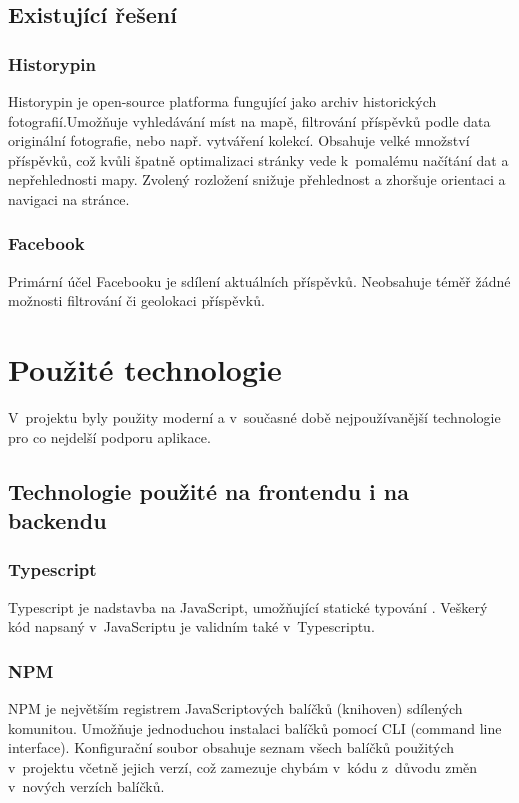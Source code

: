 \documentclass[12pt, a4paper,
  oneside,      %
]{report}
\begin{document}
\section{Existující řešení}
\subsection{Historypin}
Historypin je open-source platforma fungující jako archiv historických fotografií.Umožňuje vyhledávání míst na mapě, filtrování příspěvků podle data originální fotografie, nebo např. vytváření kolekcí. Obsahuje velké množství příspěvků, což kvůli špatně optimalizaci stránky vede k~pomalému načítání dat a nepřehlednosti mapy. Zvolený rozložení snižuje přehlednost a zhoršuje orientaci a navigaci na stránce.
\subsection{Facebook}
Primární účel Facebooku je sdílení aktuálních příspěvků. Neobsahuje téměř žádné možnosti filtrování či geolokaci příspěvků.

\chapter{Použité technologie}
V~projektu byly použity moderní a v~současné době nejpoužívanější technologie pro co nejdelší podporu aplikace.
\section{Technologie použité na frontendu i na backendu}
    \subsection{Typescript}
    Typescript je nadstavba na JavaScript, umožňující statické typování \cite{DynamicVsStaticTyping}. Veškerý kód napsaný v~JavaScriptu je validním také v~Typescriptu. \cite{whatIsTypescript}\cite{typescriptForTheNewProgrammer}

    \subsection{NPM}
    NPM je největším registrem JavaScriptových balíčků (knihoven) sdílených komunitou. Umožňuje jednoduchou instalaci balíčků pomocí CLI (command line interface). Konfigurační soubor obsahuje seznam všech balíčků použitých v~projektu včetně jejich verzí, což zamezuje chybám v~kódu z~důvodu změn v~nových verzích balíčků. \cite{whatIsNpmW3}\cite{aboutNpm}
\end{document}
